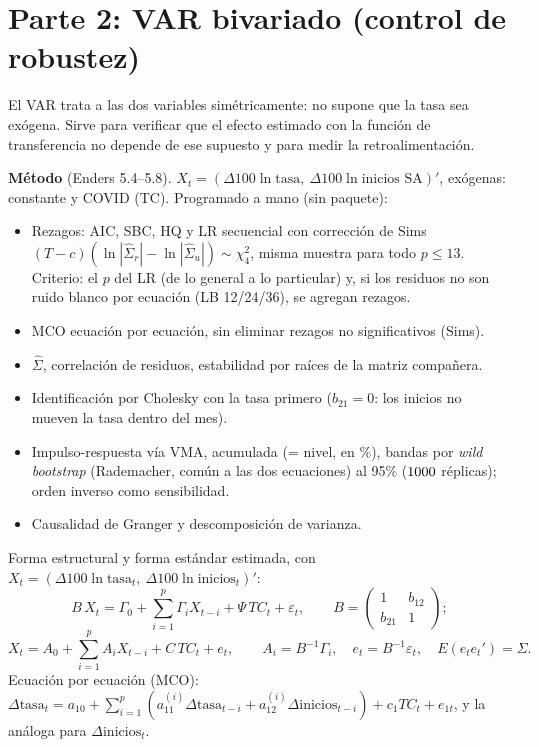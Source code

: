 \documentclass[11pt,a4paper]{article}
\begin{document}
\section{Parte 2: VAR bivariado (control de robustez)}\label{sec:var}
El VAR trata a las dos variables sim\'etricamente: no supone que la tasa sea ex\'ogena. Sirve para verificar que el efecto estimado con la funci\'on de transferencia no depende de ese supuesto y para medir la retroalimentaci\'on.

\textbf{M\'etodo} (Enders 5.4--5.8). $X_t=(\Delta100\ln\text{tasa},\ \Delta100\ln\text{inicios SA})'$, ex\'ogenas: constante y COVID (TC). Programado a mano (sin paquete):
\begin{itemize}[nosep]
\item Rezagos: AIC, SBC, HQ y LR secuencial con correcci\'on de Sims $(T-c)(\ln|\hat\Sigma_r|-\ln|\hat\Sigma_u|)\sim\chi^2_4$, misma muestra para todo $p\le13$. Criterio: el $p$ del LR (de lo general a lo particular) y, si los residuos no son ruido blanco por ecuaci\'on (LB 12/24/36), se agregan rezagos.
\item MCO ecuaci\'on por ecuaci\'on, sin eliminar rezagos no significativos (Sims).
\item $\hat\Sigma$, correlaci\'on de residuos, estabilidad por ra\'ices de la matriz compa\~nera.
\item Identificaci\'on por Cholesky con la tasa primero ($b_{21}=0$: los inicios no mueven la tasa dentro del mes).
\item Impulso-respuesta v\'ia VMA, acumulada (= nivel, en \%), bandas por \emph{wild bootstrap} (Rademacher, com\'un a las dos ecuaciones) al 95\% ($1000$ r\'eplicas); orden inverso como sensibilidad.
\item Causalidad de Granger y descomposici\'on de varianza.
\end{itemize}
\par Forma estructural y forma est\'andar estimada, con $X_t=(\Delta100\ln\text{tasa}_t,\ \Delta100\ln\text{inicios}_t)'$:
\[B\,X_t=\Gamma_0+\sum_{i=1}^{p}\Gamma_iX_{t-i}+\Psi\,TC_t+\varepsilon_t,\qquad B=\begin{pmatrix}1&b_{12}\\b_{21}&1\end{pmatrix};\]
\[X_t=A_0+\sum_{i=1}^{p}A_iX_{t-i}+C\,TC_t+e_t,\qquad A_i=B^{-1}\Gamma_i,\quad e_t=B^{-1}\varepsilon_t,\quad E(e_te_t')=\Sigma.\]
Ecuaci\'on por ecuaci\'on (MCO): $\Delta\text{tasa}_t=a_{10}+\sum_{i=1}^p(a^{(i)}_{11}\Delta\text{tasa}_{t-i}+a^{(i)}_{12}\Delta\text{inicios}_{t-i})+c_1TC_t+e_{1t}$, y la an\'aloga para $\Delta\text{inicios}_t$.
\end{document}
